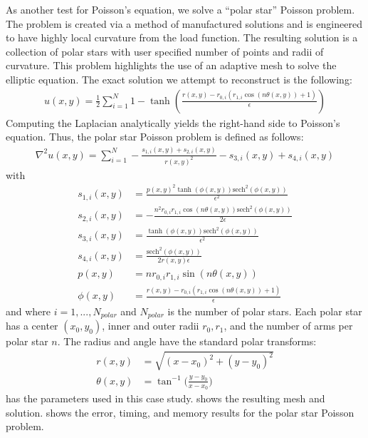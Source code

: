As another test for Poisson's equation, we solve a ``polar star'' Poisson problem. The problem is created via a method of manufactured solutions and is engineered to have highly local curvature from the load function. The resulting solution is a collection of polar stars with user specified number of points and radii of curvature. This problem highlights the use of an adaptive mesh to solve the elliptic equation. The exact solution we attempt to reconstruct is the following:
\begin{align}
    u(x,y) = \frac{1}{2} \sum_{i=1}^{N} 1 - \tanh \left(\frac{r(x,y)-r_{0,i} \left(r_{1,i} \cos \left(n \theta(x,y)\right)+1\right)}{\epsilon }\right)
\end{align}
Computing the Laplacian analytically yields the right-hand side to Poisson's equation. Thus, the polar star Poisson problem is defined as follows:
\begin{align}
    \nabla^2 u(x,y) = \sum_{i=1}^N -\frac{s_{1,i}(x,y) + s_{2,i}(x, y)}{r(x,y)^2} - s_{3,i}(x,y) + s_{4,i}(x,y)
\end{align}
with
\begin{align*}
    s_{1,i}(x,y) &= \frac{p(x,y)^2 \tanh \left(\phi(x,y)\right) \text{sech}^2\left(\phi(x,y)\right)}{\epsilon ^2} \\
    s_{2,i}(x,y) &= -\frac{n^2 r_{0,i} r_{1,i} \cos (n \theta(x,y)) \text{sech}^2\left(\phi(x,y)\right)}{2 \epsilon } \\
    s_{3,i}(x,y) &= \frac{\tanh \left(\phi(x,y)\right) \text{sech}^2\left(\phi(x,y)\right)}{\epsilon ^2} \\
    s_{4,i}(x,y) &= \frac{\text{sech}^2\left(\phi(x,y)\right)}{2 r(x,y) \epsilon } \\
    p(x,y) &= n r_{0,i} r_{1,i} \sin (n \theta(x,y)) \\
    \phi(x,y) &= \frac{r(x,y)-r_{0,i} (r_{1,i} \cos (n \theta(x,y))+1)}{\epsilon}
\end{align*}
and where $i=1, ..., N_{polar}$ and $N_{polar}$ is the number of polar stars. Each polar star has a center $(x_0, y_0)$, inner and outer radii $r_0, r_1$, and the number of arms per polar star $n$. The radius and angle have the standard polar transforms:
\begin{align}
    r(x,y) &= \sqrt{(x - x_0)^2 + (y - y_0)^2} \\
    \theta(x,y) &= \tan^{-1}\Big(\frac{y - y_0}{x - x_0}\Big)
\end{align}
 has the parameters used in this case study.  shows the resulting mesh and solution.  shows the error, timing, and memory results for the polar star Poisson problem.
